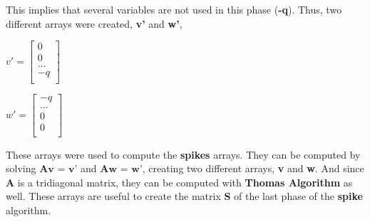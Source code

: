 \documentclass[12pt]{article}
\begin{document}
\par This implies that several variables are not used in this phase (\textbf{-q}). Thus, two different arrays were created\cite{spike}, \textbf{v'} and \textbf{w'},
\newline
\begin{center}
\begin{minipage}{.5\textwidth}
  \centering
 $
v' = 
\begin{bmatrix}
	0 \\
	0 \\
    \dots \\
    -q \\
\end{bmatrix}
$
\end{minipage}%
\begin{minipage}{.5\textwidth}
  \centering
   $
w' = 
\begin{bmatrix}
	-q \\
	\dots \\
    0 \\
    0 \\
\end{bmatrix}
$
\end{minipage}
\end{center}

\par These arrays were used to compute the \textbf{spikes} arrays. They can be computed by solving $\textbf{Av = v'}$ and $\textbf{Aw = w'}$, creating two different arrays, \textbf{v} and \textbf{w}. And since \textbf{A} is a tridiagonal matrix, they can be computed with \textbf{Thomas Algorithm} as well. These arrays are useful to create the matrix \textbf{S} of the last phase of the \textbf{spike} algorithm. 
\end{document}
